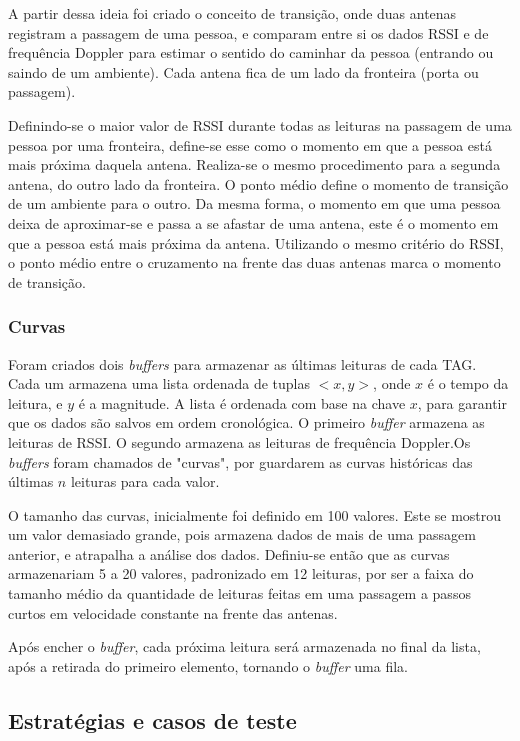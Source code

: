  A partir dessa ideia foi criado o conceito de transição, onde duas antenas registram a passagem de uma pessoa, e comparam entre si os dados RSSI e de frequência Doppler para estimar o sentido do caminhar da pessoa (entrando ou saindo de um ambiente). Cada antena fica de um lado da fronteira (porta ou passagem).
 
 Definindo-se o maior valor de RSSI durante todas as leituras na passagem de uma pessoa por uma fronteira, define-se esse como o momento em que a pessoa está mais próxima daquela antena. Realiza-se o mesmo procedimento para a segunda antena, do outro lado da fronteira. O ponto médio define o momento de transição de um ambiente para o outro. Da mesma forma, o momento em que uma pessoa deixa de aproximar-se e passa a se afastar de uma antena, este é o momento em que a pessoa está mais próxima da antena. Utilizando o mesmo critério do RSSI, o ponto médio entre o cruzamento na frente das duas antenas marca o momento de transição.
 
 \subsubsection{Curvas} \label{section:curvas}
 
 Foram criados dois \textit{buffers} para armazenar as últimas leituras de cada TAG. Cada um armazena uma lista ordenada de tuplas $<x,y>$, onde $x$ é o tempo da leitura, e $y$ é a magnitude. A lista é ordenada com base na chave $x$, para garantir que os dados são salvos em ordem cronológica. O primeiro \textit{buffer} armazena as leituras de RSSI. O segundo armazena as leituras de frequência Doppler.Os \textit{buffers} foram chamados de "curvas", por guardarem as curvas históricas das últimas $n$ leituras para cada valor.
 
 O tamanho das curvas, inicialmente foi definido em 100 valores. Este se mostrou um valor demasiado grande, pois armazena dados de mais de uma passagem anterior, e atrapalha a análise dos dados. Definiu-se então que as curvas armazenariam 5 a 20 valores, padronizado em 12 leituras, por ser a faixa do tamanho médio da quantidade de leituras feitas em uma passagem a passos curtos em velocidade constante na frente das antenas.
 
 Após encher o \textit{buffer}, cada próxima leitura será armazenada no final da lista, após a retirada do primeiro elemento, tornando o \textit{buffer} uma fila.

 
 \subsection{Estratégias e casos de teste} \label{section:estrategias}

